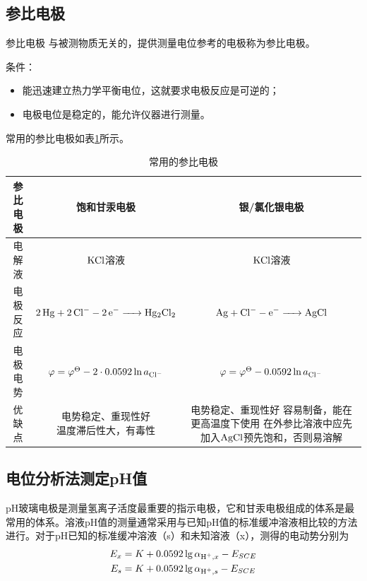 \subsection{参比电极}

\begin{definition*}{参比电极}{}
	与被测物质无关的，提供测量电位参考的电极称为参比电极。
\end{definition*}

条件：
\begin{itemize}
	\item 能迅速建立热力学平衡电位，这就要求电极反应是可逆的；
	\item 电极电位是稳定的，能允许仪器进行测量。
\end{itemize}

常用的参比电极如表\ref{tab:canbidianji}所示。

\begin{table}[!h]
	\centering
	\caption{常用的参比电极}
	\small
	\begin{tabular}{ccc}
		\toprule
		参比电极  & {饱和甘汞电极} & {银/氯化银电极} \\
		\midrule
		电解液   & $\ce{KCl}$溶液 & $\ce{KCl}$溶液 \\
		电极反应  & $\ce{2Hg + 2Cl- - 2e- -> Hg2Cl2}$ & $\ce{Ag + Cl- - e- -> AgCl}$ \\
		电极电势  & $\varphi=\varphi^{\Theta}-2\cdot 0.0592\ln a_{\ce{Cl-}}$ & $\varphi=\varphi^{\Theta}-0.0592\ln a_{\ce{Cl-}}$ \\
		优缺点    & \tabincell{c}{电势稳定、重现性好\\ 温度滞后性大，有毒性} & \tabincell{c}{电势稳定、重现性好\\ 容易制备，能在更高温度下使用\\ 在外参比溶液中应先加入$\ce{AgCl}$预先饱和，否则易溶解} \\
		\bottomrule
	\end{tabular}%
	\normalsize
	\label{tab:canbidianji}%
\end{table}%

\subsection{电位分析法测定pH值}

pH玻璃电极是测量氢离子活度最重要的指示电极，它和甘汞电极组成的体系是最常用的体系。溶液pH值的测量通常采用与已知pH值的标准缓冲溶液相比较的方法进行。对于$\mathrm{pH}$已知的标准缓冲溶液（s）和未知溶液（x），测得的电动势分别为
\begin{gather*}
	E_x=K+0.0592\lg {\alpha_{\ce{H+},x}}-E_{SCE}\\
	E_s=K+0.0592\lg {\alpha_{\ce{H+},s}}-E_{SCE}
\end{gather*}

